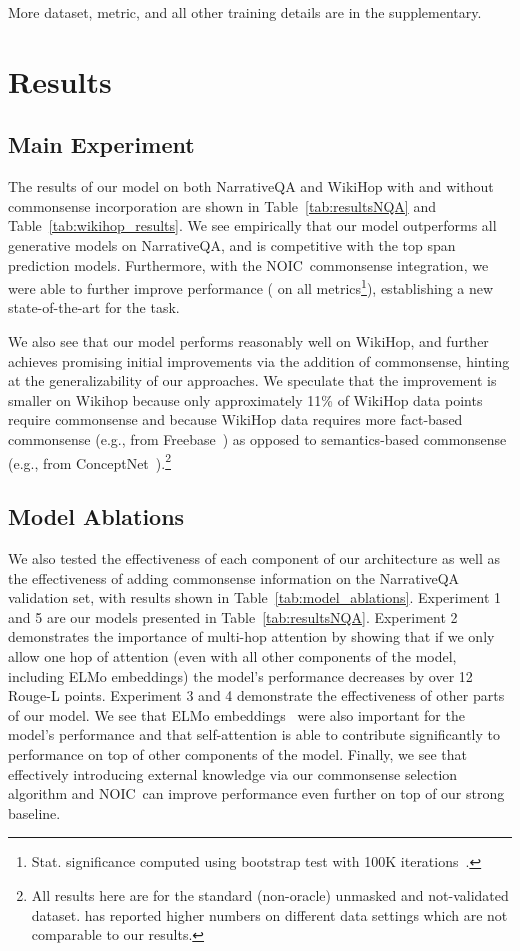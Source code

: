 \documentclass[11pt,a4paper]{article}
\def\tabref#1{Table~\ref{#1}}
\newcommand{\fullModel}{NOIC}
\begin{document}
More dataset, metric, and all other training details are in the supplementary.

 \section{Results}
\label{sec:results}
\subsection{Main Experiment}

The results of our model on both NarrativeQA and WikiHop with and without commonsense incorporation are shown in \tabref{tab:resultsNQA} and \tabref{tab:wikihop_results}.
We see empirically that our model outperforms all generative models on NarrativeQA, and is competitive with the top span prediction models.
Furthermore, with the \fullModel\ commonsense integration, we were able to further improve performance ( on all metrics\footnote{Stat. significance computed using bootstrap test with 100K iterations~\cite{noreen1989computer,efron1994introduction}.}), establishing a new state-of-the-art for the task.

We also see that our model performs reasonably well on WikiHop, and further achieves promising initial improvements via the addition of commonsense, hinting at the generalizability of our approaches. We speculate that the improvement is smaller on Wikihop because only approximately 11\% of WikiHop data points require commonsense and because WikiHop data requires more fact-based commonsense (e.g., from Freebase~\cite{bollacker2008freebase}) as opposed to semantics-based commonsense (e.g., from ConceptNet~\cite{speer2012representing}).\footnote{All results here are for the standard (non-oracle) unmasked and not-validated dataset.  has reported higher numbers on different data settings which are not comparable to our results.}


\subsection{Model Ablations}

We also tested the effectiveness of each component of our architecture as well as the effectiveness of adding commonsense information on the NarrativeQA validation set, with results shown in \tabref{tab:model_ablations}.
Experiment 1 and 5 are our models presented in \tabref{tab:resultsNQA}.
Experiment 2 demonstrates the importance of multi-hop attention by showing that if we only allow one hop of attention (even with all other components of the model, including ELMo embeddings) the model's performance decreases by over 12 Rouge-L points.
Experiment 3 and 4 demonstrate the effectiveness of other parts of our model. We
see that ELMo embeddings~\cite{peters2018deep} were also important for the
model's performance
and that self-attention is able to
contribute significantly to performance on top of other components of the model.
Finally, we see that effectively introducing external knowledge via our commonsense selection algorithm and \fullModel\ can improve performance even further on top of our strong baseline.
\end{document}
